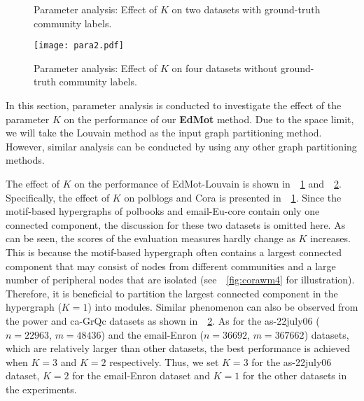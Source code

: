 \documentclass[sigconf]{acmart}
\begin{document}
\begin{figure}[!t]
\vskip -0.1in
\renewcommand{\subfigcapskip}{-4pt}
\renewcommand{\subfigbottomskip}{0pt}
\centerline{
{}
{}}
\caption{Parameter analysis: Effect of $K$ on two datasets with ground-truth community labels. } \label{fig:para1}
\vskip -0.1in
\end{figure}




\begin{figure}[!t]
\texttt{[image: para2.pdf]}\vskip-0.1in
\caption{Parameter analysis: Effect of $K$ on four datasets without ground-truth community labels.} \label{fig:para2}
\vskip-0.1in
\end{figure}



In this section, parameter analysis is conducted to investigate the effect of the parameter $K$ on the performance of our \textbf{EdMot} method. Due to the space limit, we will take the Louvain method as the input graph partitioning method. However, similar analysis can be conducted by using any other graph partitioning methods.





The effect of $K$ on the performance of EdMot-Louvain is shown in~\figurename~\ref{fig:para1} and~\figurename~\ref{fig:para2}. Specifically, the effect of $K$ on polblogs and Cora is presented in~\figurename~\ref{fig:para1}. Since the motif-based hypergraphs of polbooks and email-Eu-core contain only one connected component, the discussion for these two datasets is omitted here. As can be seen, the scores of the evaluation measures hardly change as $K$ increases. This is because the motif-based hypergraph often contains a largest connected component that may consist of nodes from different communities and a large number of peripheral nodes that are isolated (see~\figurename~\ref{fig:corawm4} for illustration). Therefore, it is beneficial to partition the largest connected component in the hypergraph ($K=1$) into modules. Similar phenomenon can also be observed from the power and ca-GrQc datasets as shown in~\figurename~\ref{fig:para2}. As for the as-22july06 ($n=22963$, $m=48436$) and the email-Enron ($n=36692$, $m=367662$) datasets, which are relatively larger than other datasets, the best performance is achieved when $K=3$ and $K=2$ respectively. Thus, we set $K=3$ for the as-22july06 dataset, $K=2$ for the email-Enron dataset and $K=1$ for the other datasets in the experiments.
\end{document}

